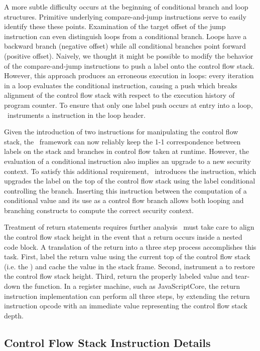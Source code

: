 A more subtle difficulty occurs at the beginning of conditional branch and loop structures.
Primitive underlying compare-and-jump instructions serve to easily identify these these points.
Examination of the target offset of the jump instruction can even distinguish loops from a conditional branch.
Loops have a backward branch (negative offset) while all conditional branches point forward (positive offset).
Naively, we thought it might be possible to modify the behavior of the compare-and-jump instructions to push a label onto the control flow stack.
However, this approach produces an erroneous execution in loops: every iteration in a loop evaluates the conditional instruction, causing a push which breaks alignment of the control flow stack with respect to the execution history of program counter.
To ensure that only one label push occurs at entry into a loop, \JitFlow\ instruments a \dup instruction in the loop header.

Given the introduction of two instructions for manipulating the control flow stack, the \JitFlow\ framework can now reliably keep the 1-1 correspondence between labels on the stack and branches in control flow taken at runtime.
However, the evaluation of a conditional instruction also implies an upgrade to a new security context.
To satisfy this additional requirement, \JitFlow\ introduces the \join instruction, which upgrades the label on the top of the control flow stack using the label conditional controlling the branch.
Inserting this instruction between the computation of a conditional value and its use as a control flow branch allows both looping and branching constructs to compute the correct security context.

Treatment of return statements requires further analysis
\JitFlow\ must take care to align the control flow stack height in the event that a return occurs inside a nested code block.
A translation of the return into a three step process accomplishes this task.
First, label the return value using the current top of the control flow stack (i.e. the \pclabel) and cache the value in the stack frame.
Second, instrument a \popj to restore the control flow stack height.
Third, return the properly labeled value and tear-down the function.
In a register machine, such as JavaScriptCore, the return instruction implementation can perform all three steps, by extending the return instruction opcode with an immediate value representing the control flow stack depth.

\subsection{Control Flow Stack Instruction Details}

